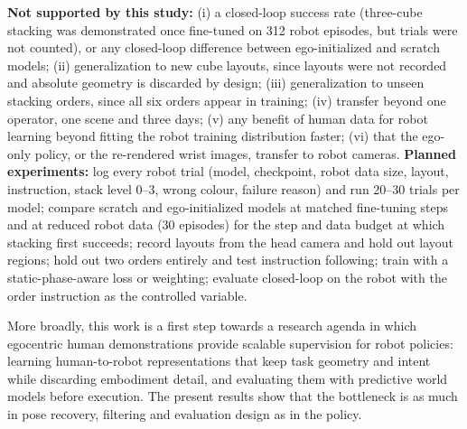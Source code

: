 \documentclass[conference,10pt]{IEEEtran}
\begin{document}
\textbf{Not supported by this study:} (i) a closed-loop success rate (three-cube stacking was demonstrated once fine-tuned on 312 robot episodes, but trials were
not counted), or any closed-loop difference between ego-initialized and scratch models; (ii) generalization to new cube layouts, since layouts
were not recorded and absolute geometry is discarded by design; (iii) generalization to unseen stacking orders, since all six
orders appear in training; (iv) transfer beyond one operator, one scene and three days; (v) any benefit of human data for robot learning beyond fitting the robot training distribution faster; (vi) that the
ego-only policy, or the re-rendered wrist images, transfer to robot cameras. \textbf{Planned experiments:} log every robot trial (model, checkpoint, robot data size, layout, instruction, stack
level 0--3, wrong colour, failure reason) and run 20--30 trials per model; compare scratch and ego-initialized models at
matched fine-tuning steps and at reduced robot data (30 episodes) for the step and data budget at which stacking first
succeeds; record layouts from the head camera and hold out layout regions; hold out two orders
entirely and test instruction following; train with a static-phase-aware loss or weighting; evaluate closed-loop on the robot
with the order instruction as the controlled variable.

More broadly, this work is a first step towards a research agenda in which egocentric human demonstrations provide scalable
supervision for robot policies: learning human-to-robot representations that keep task geometry and intent while discarding
embodiment detail, and evaluating them with predictive world models before execution. The present results show that the
bottleneck is as much in pose recovery, filtering and evaluation design as in the policy.
\end{document}
